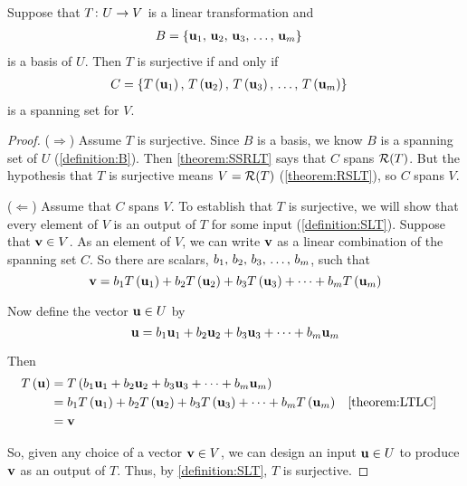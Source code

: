 \documentclass{ximera}
\begin{document}
\begin{theorem}
\label{theorem:SLTB}


Suppose that $T\colon U\rightarrow V$ is a linear transformation and
\begin{align*}
B&=\left\{\mathbf{u}_{1},\,\mathbf{u}_{2},\,\mathbf{u}_{3},\,\ldots,\,\mathbf{u}_{m}\right\}
\end{align*}
is a basis of $U$.  Then $T$ is surjective if and only if
\begin{align*}
C&=\left\{T\left(\mathbf{u}_1\right),\,T\left(\mathbf{u}_2\right),\,T\left(\mathbf{u}_3\right),\,\ldots,\,T\left(\mathbf{u}_m\right)\right\}
\end{align*}
is a spanning set for $V$.




\begin{proof}
($\Rightarrow$)  Assume $T$ is surjective.  Since $B$ is a basis, we know $B$ is a spanning set of $U$ (\ref{definition:B}).  Then \ref{theorem:SSRLT} says that $C$ spans $\mathcal{R}\!\left(T\right)$.  But the hypothesis that $T$ is surjective means $V=\mathcal{R}\!\left(T\right)$ (\ref{theorem:RSLT}), so $C$ spans $V$.



($\Leftarrow$)  Assume that $C$ spans $V$.  To establish that $T$ is surjective, we will show that every element of $V$ is an output of $T$ for some input (\ref{definition:SLT}).  Suppose that $\mathbf{v}\in V$.  As an element of $V$, we can write $\mathbf{v}$ as a linear combination of the spanning set $C$.  So there are scalars, ${b}_{1},\,{b}_{2},\,{b}_{3},\,\ldots,\,{b}_{m}$, such that
\[
\mathbf{v}=b_1T\left(\mathbf{u}_1\right)+b_2T\left(\mathbf{u}_2\right)+b_3T\left(\mathbf{u}_3\right)+\cdots+b_mT\left(\mathbf{u}_m\right)
\]




Now define the vector $\mathbf{u}\in U$ by
\[
\mathbf{u}=b_{1}\mathbf{u}_{1}+b_{2}\mathbf{u}_{2}+b_{3}\mathbf{u}_{3}+\cdots +b_{m}\mathbf{u}_{m}
\]




Then
\begin{align*}
T\left(\mathbf{u}\right)&=T\left(b_{1}\mathbf{u}_{1}+b_{2}\mathbf{u}_{2}+b_{3}\mathbf{u}_{3}+\cdots +b_{m}\mathbf{u}_{m}\right)\\
&=b_1T\left(\mathbf{u}_1\right)+b_2T\left(\mathbf{u}_2\right)+b_3T\left(\mathbf{u}_3\right)+\cdots+b_mT\left(\mathbf{u}_m\right)&&\ref{theorem:LTLC}\\
&=\mathbf{v}
\end{align*}




So, given any choice of a vector $\mathbf{v}\in V$, we can design an input $\mathbf{u}\in U$ to produce $\mathbf{v}$ as an output of $T$.  Thus, by \ref{definition:SLT}, $T$ is surjective.



\end{proof}
\end{theorem}
\end{document}

